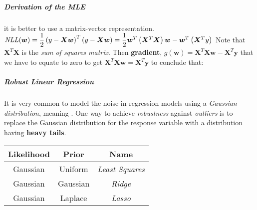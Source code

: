 \subparagraph{Derivation of the MLE}
it is better to use a matrix-vector representation.\\
$\text{\emph{NLL}}(\bm{w}) = \dfrac{1}{2}\left(y-\bm{X}\bm{w}\right)^{T}\left(y-\bm{X}
\bm{w}\right) = \dfrac{1}{2}\bm{w}^{T}\left(\bm{X}^{T}\bm{X}\right)\bm{w} - \bm{w}^{T}
\left(\bm{X}^{T}y\right)$ Note that $\bm{X}^{T}\bm{X}$ is the \emph{sum of squares 
matrix}. Then \textbf{gradient}, $g(\bm{w}) = \bm{X}^{T}\bm{X}\bm{w} - \bm{X}^{T}\bm{y}$
that we have to equate to zero to get $\bm{X}^{T}\bm{X}\bm{w} = \bm{X}^{T}\bm{y}$ to 
conclude that:
\begin{center}
\end{center}

\subparagraph{Robust Linear Regression}
It is very common to model the noise in regression models using a \emph{Gaussian 
distribution}, meaning . One way to achieve \emph{robustness} against \emph{outliers}
is to replace the Gaussian distribution for the response variable with a distribution 
having \textbf{heavy tails}.

\begin{center}
    \begin{tabular}{|*{3}{c|}}
    \hline
    \textbf{Likelihood} & \textbf{Prior} & \textbf{Name}\\
    \hline
    Gaussian & Uniform & \emph{Least Squares}\\
    \hline
    Gaussian & Gaussian & \emph{Ridge}\\
    \hline
    Gaussian & Laplace & \emph{Lasso}\\
    \hline
    \end{tabular}
\end{center}

